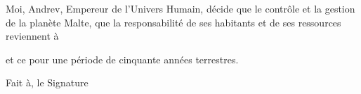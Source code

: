 \documentclass[14pt]{extarticle}
\begin{document}
\begin{framed}
    Moi, Andrev, Empereur de l'Univers Humain, décide que le contrôle et la
    gestion de la planète Malte, que la responsabilité de ses habitants et de
    ses ressources reviennent à

    \vspace{7cm}

    et ce pour une période de cinquante années terrestres.

    \vspace{7cm}

    \noindent
    Fait à\hspace{4cm}, le \hfill Signature

    \vspace{3cm}

\end{framed}
\end{document}
